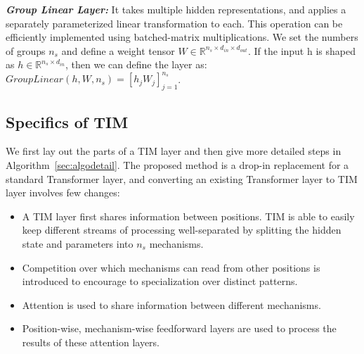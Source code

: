 \documentclass{article}
\newcommand{\Ani}[1]{{\color{blue} [AG: #1]}}
\begin{document}
{\bfseries \itshape Group Linear Layer: } It takes multiple hidden representations, and applies a separately parameterized linear transformation to each.  This operation can be efficiently implemented using batched-matrix multiplications.  We set the numbers of groups $n_s$ and define a weight tensor $W \in \mathbb{R}^{n_s \times d_\mathit{in} \times d_\mathit{out}}$.  If the input h is shaped as $h \in \mathbb{R}^{n_s \times d_\mathit{in}}$, then we can define the layer as: $\textit{GroupLinear}(h, W, n_s) = { [ h_j W_j ] }_{j=1}^{n_s}$.  










\subsection{Specifics of TIM}

We first lay out the parts of a TIM layer and then give more detailed steps in Algorithm~\ref{sec:algodetail}. The proposed method is a drop-in replacement for a standard Transformer layer, and converting an existing Transformer layer to TIM layer involves few changes:

\begin{itemize}
    \item A TIM layer first shares information between positions.  TIM is able to easily keep different streams of processing well-separated by splitting the hidden state and parameters into $n_s$ mechanisms.
    \item Competition over which mechanisms can read from other positions is introduced to encourage to specialization over distinct patterns.  
    \item Attention is used to share information between different mechanisms.  
    \item Position-wise, mechanism-wise feedforward layers are used to process the results of these attention layers.  
\end{itemize}
\end{document}
